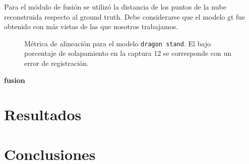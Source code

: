 \documentclass{pfc}
\newcommand{\Alerta}[1]{{\Huge\bfseries\sffamily#1}}
\begin{document}
		Para el módulo de fusión se utilizó la distancia de los puntos de la
		nube reconstruida respecto al ground truth.
		Debe considerarse que el modelo gt fue obtenido con más vistas de las que nosotros trabajamos.


		

		


		\begin{figure}
			\center
				\resizebox{\linewidth}{!}{}
			\caption{\label{fig:fitness}Métrica de alineación para el modelo \texttt{dragon stand}. El bajo
			porcentaje de solapamiento en la captura 12 se corresponde
			con un error de registración.}
		\end{figure}

		\Alerta{fusion}
		

	\section{Resultados}

	\section{Conclusiones}



	
	
\end{document}
